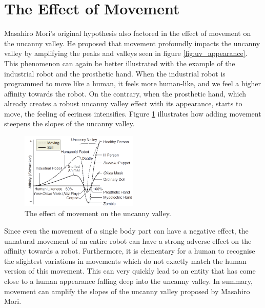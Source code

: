 \section{The Effect of Movement}
Masahiro Mori's original hypothesis \cite{original_masahiro} also factored in the effect of movement on the uncanny valley. He proposed that movement profoundly impacts the uncanny valley by amplifying the peaks and valleys seen in figure \ref{fig:uv_appearance}. This phenomenon can again be better illustrated with the example of the industrial robot and the prosthetic hand. When the industrial robot is programmed to move like a human, it feels more human-like, and we feel a higher affinity towards the robot. On the contrary, when the prosthetic hand, which already creates a robust uncanny valley effect with its appearance, starts to move, the feeling of eeriness intensifies.
Figure \ref{fig:uv_movement} illustrates how adding movement steepens the slopes of the uncanny valley.
\begin{figure} %
    \centering
    \includegraphics[width=0.5\textwidth]{graphics/uv_movement.png}
    \caption{The effect of movement on the uncanny valley.}
    \label{fig:uv_movement}
\end{figure}
Since even the movement of a single body part can have a negative effect, the unnatural movement of an entire robot can have a strong adverse effect on the affinity towards a robot. Furthermore, it is elementary for a human to recognise the slightest variations in movements which do not exactly match the human version of this movement. This can very quickly lead to an entity that has come close to a human appearance falling deep into the uncanny valley. In summary, movement can amplify the slopes of the uncanny valley proposed by Masahiro Mori.